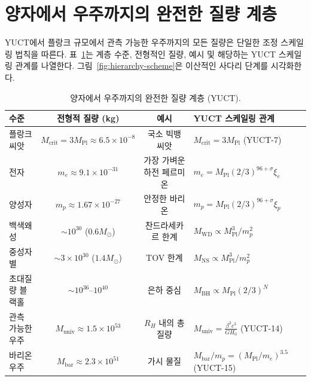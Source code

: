 \documentclass[12pt,a4paper]{article}
\newcommand{\betaf}{\beta}
\begin{document}
	\section{양자에서 우주까지의 완전한 질량 계층}
	
	YUCT에서 플랑크 규모에서 관측 가능한 우주까지의 모든 질량은 단일한 조정 스케일링 법칙을 따른다. 표~\ref{tab:full-hierarchy}는 계층 수준, 전형적인 질량, 예시 및 해당하는 YUCT 스케일링 관계를 나열한다. 그림~\ref{fig:hierarchy-scheme}은 이산적인 사다리 단계를 시각화한다.
	
	\begin{table}[htbp]
		\centering
		\caption{양자에서 우주까지의 완전한 질량 계층 (YUCT).}
		\label{tab:full-hierarchy}
		\small
		\begin{tabular}{l c c l}
			\toprule
			\textbf{수준} & \textbf{전형적 질량 (kg)} & \textbf{예시} & \textbf{YUCT 스케일링 관계} \\
			\midrule
			플랑크 씨앗 & \(M_{\mathrm{crit}} = 3M_{\mathrm{Pl}} \approx 6.5\times10^{-8}\) & 국소 빅뱅 씨앗 & \(M_{\mathrm{crit}} = 3 M_{\mathrm{Pl}}\) (YUCT-7) \\
			전자 & \(m_e \approx 9.1\times10^{-31}\) & 가장 가벼운 하전 페르미온 & \(m_e = M_{\mathrm{Pl}} (2/3)^{96+\sigma}\xi_e\) \\
			양성자 & \(m_p \approx 1.67\times10^{-27}\) & 안정한 바리온 & \(m_p = M_{\mathrm{Pl}} (2/3)^{96+\sigma}\xi_p\) \\
			백색왜성 & \(\sim 10^{30}\) (\(0.6M_\odot\)) & 찬드라세카르 한계 & \(M_{\mathrm{WD}} \propto M_{\mathrm{Pl}}^{3}/m_p^2\) \\
			중성자별 & \(\sim 3\times10^{30}\) (\(1.4M_\odot\)) & TOV 한계 & \(M_{\mathrm{NS}} \propto M_{\mathrm{Pl}}^{3}/m_p^2\) \\
			초대질량 블랙홀 & \(\sim 10^{36}\)–\(10^{40}\) & 은하 중심 & \(M_{\mathrm{BH}} \propto M_{\mathrm{Pl}} (2/3)^{N}\) \\
			관측 가능한 우주 & \(M_{\mathrm{univ}} \approx 1.5\times10^{53}\) & \(R_H\) 내의 총 질량 & \(M_{\mathrm{univ}} = \frac{\betaf^2 c^3}{G H_0}\) (YUCT-14) \\
			바리온 우주 & \(M_{\mathrm{bar}} \approx 2.3\times10^{51}\) & 가시 물질 & \(M_{\mathrm{bar}}/m_p = (M_{\mathrm{Pl}}/m_e)^{3.5}\) (YUCT-15) \\
			\bottomrule
		\end{tabular}
	\end{table}
	
\end{document}
